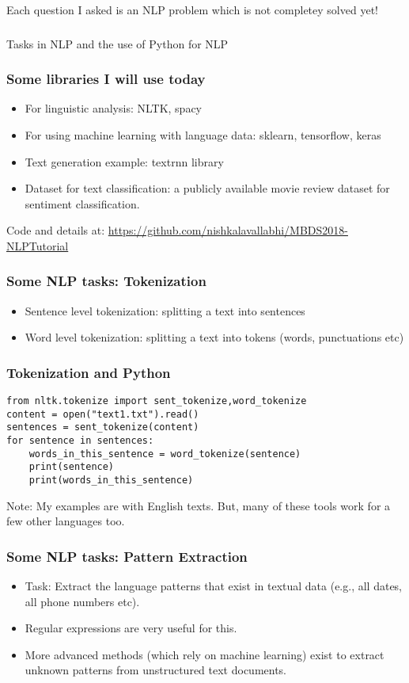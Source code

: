 \documentclass{beamer}
\begin{document}
\begin{frame}
Each question I asked is an NLP problem which is not completey solved yet!
\end{frame} 

\begin{frame}
\frametitle{}
\Large Tasks in NLP and the use of Python for NLP \small
\end{frame}

\begin{frame}
\frametitle{Some libraries I will use today}
\begin{itemize}
\item For linguistic analysis: NLTK, spacy
\item For using machine learning with language data: sklearn, tensorflow, keras
\item Text generation example: textrnn library
\item Dataset for text classification: a publicly available movie review dataset for sentiment classification.
\end{itemize}
Code and details at: \footnotesize \url{https://github.com/nishkalavallabhi/MBDS2018-NLPTutorial}
\end{frame}

\begin{frame}
\frametitle{Some NLP tasks: Tokenization}
\begin{itemize}
\item Sentence level tokenization: splitting a text into sentences
\item Word level tokenization: splitting a text into tokens (words, punctuations etc)
\end{itemize}
\end{frame}

\begin{frame}[fragile]
\frametitle{Tokenization and Python}
\small
\begin{verbatim}
from nltk.tokenize import sent_tokenize,word_tokenize
content = open("text1.txt").read()
sentences = sent_tokenize(content)
for sentence in sentences:
    words_in_this_sentence = word_tokenize(sentence)
    print(sentence)
    print(words_in_this_sentence)
\end{verbatim}
Note: My examples are with English texts. But, many of these tools work for a few other languages too. 
\end{frame}

\begin{frame}
\frametitle{Some NLP tasks: Pattern Extraction}
\begin{itemize}
\item Task: Extract the language patterns that exist in textual data (e.g., all dates, all phone numbers etc). 
\item Regular expressions are very useful for this.
\item More advanced methods (which rely on machine learning) exist to extract unknown patterns from unstructured text documents.
\end{itemize}
\end{frame}
\end{document}

